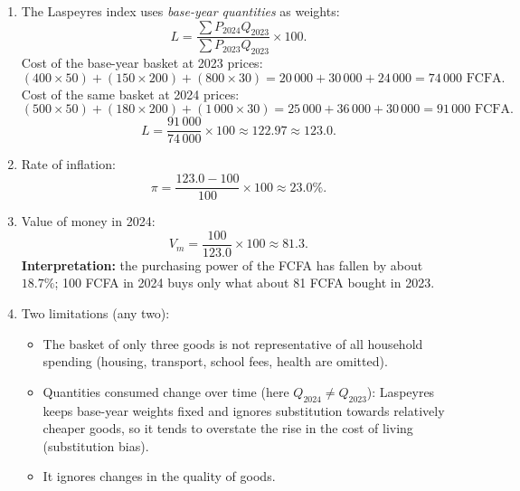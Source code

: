 \documentclass[11pt]{article}
\newcommand{\cle}[1]{{\popxbold\color{popdark}#1}}
\begin{document}
\begin{corrige}
\begin{enumerate}
\item The \cle{Laspeyres index} uses \emph{base-year quantities} as weights:
\[ L = \frac{\sum P_{2024} Q_{2023}}{\sum P_{2023} Q_{2023}} \times 100. \]
Cost of the base-year basket at 2023 prices:
\[ (400 \times 50) + (150 \times 200) + (800 \times 30) = 20\,000 + 30\,000 + 24\,000 = 74\,000 \text{ FCFA}. \]
Cost of the same basket at 2024 prices:
\[ (500 \times 50) + (180 \times 200) + (1\,000 \times 30) = 25\,000 + 36\,000 + 30\,000 = 91\,000 \text{ FCFA}. \]
\[ L = \frac{91\,000}{74\,000} \times 100 \approx 122.97 \approx 123.0. \]
\item Rate of inflation:
\[ \pi = \frac{123.0 - 100}{100} \times 100 \approx 23.0\%. \]
\item Value of money in 2024:
\[ V_m = \frac{100}{123.0} \times 100 \approx 81.3. \]
\textbf{Interpretation:} the purchasing power of the FCFA has fallen by about $18.7\%$; 100 FCFA in 2024 buys only what about 81 FCFA bought in 2023.
\item Two limitations (any two):
\begin{itemize}
\item The basket of only three goods is not representative of all household spending (housing, transport, school fees, health are omitted).
\item Quantities consumed change over time (here $Q_{2024} \neq Q_{2023}$): Laspeyres keeps base-year weights fixed and ignores substitution towards relatively cheaper goods, so it tends to overstate the rise in the cost of living (\cle{substitution bias}).
\item It ignores changes in the quality of goods.
\end{itemize}
\end{enumerate}
\end{corrige}
\end{document}
